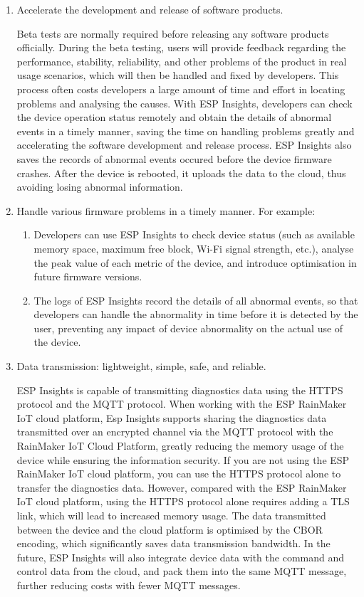 \documentclass[a4paper,12pt,openany]{book}
\begin{document}
\begin{enumerate}[label=(\arabic*)]
    \item Accelerate the development and release of software products.
    
    Beta tests are normally required before releasing any software products officially. During the beta testing, users will provide feedback regarding the performance, stability, reliability, and other problems of the product in real usage scenarios, which will then be handled and fixed by developers. This process often costs developers a large amount of time and effort in locating problems and analysing the causes. With ESP Insights, developers can check the device operation status remotely and obtain the details of abnormal events in a timely manner, saving the time on handling problems greatly and accelerating the software development and release process. ESP Insights also saves the records of abnormal events occured before the device firmware crashes. After the device is rebooted, it uploads the data to the cloud, thus avoiding losing abnormal information.

    \item Handle various firmware problems in a timely manner. For example:

    \begin{enumerate}[label=\alph*.]
        \item Developers can use ESP Insights to check device status (such as available memory space, maximum free block, Wi-Fi signal strength, etc.), analyse the peak value of each metric of the device, and introduce optimisation in future firmware versions.
        \item The logs of ESP Insights record the details of all abnormal events, so that developers can handle the abnormality in time before it is detected by the user, preventing any impact of device abnormality on the actual use of the device.
    \end{enumerate}

    \item Data transmission: lightweight, simple, safe, and reliable.
    
    ESP Insights is capable of transmitting diagnostics data using the HTTPS protocol and the MQTT protocol. When working with the ESP RainMaker IoT cloud platform, Esp Insights supports sharing the diagnostics data transmitted over an encrypted channel via the MQTT protocol with the RainMaker IoT Cloud Platform, greatly reducing the memory usage of the device while ensuring the information security. If you are not using the ESP RainMaker IoT cloud platform, you can use the HTTPS protocol alone to transfer the diagnostics data. However, compared with the ESP RainMaker IoT cloud platform, using the HTTPS protocol alone requires adding a TLS link, which will lead to increased memory usage. The data transmitted between the device and the cloud platform is optimised by the CBOR encoding, which significantly saves data transmission bandwidth. In the future, ESP Insights will also integrate device data with the command and control data from the cloud, and pack them into the same MQTT message, further reducing costs with fewer MQTT messages.
\end{enumerate}
\end{document}
